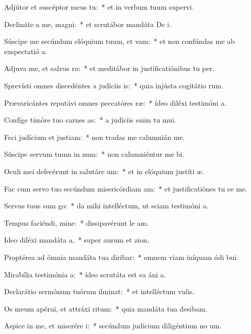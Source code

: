 \item Adjútor et suscéptor meus  tu:~* et in verbum tuum supervi.
\item Declináte a me, magni:~* et scrutábor mandáta De i.
\item Súscipe me secúndum elóquium tuum, et vam:~* et non confúndas me ab exspectatió a.
\item Adjuva me, et salvus ro:~* et meditábor in justificatiónibus tu per.
\item Sprevísti omnes discedéntes a judíciis is:~* quia injústa cogitátio rum.
\item Prævaricántes reputávi omnes peccatóres ræ:~* ídeo diléxi testimóni a.
\item Confíge timóre tuo carnes as:~* a judíciis enim tu mui.
\item Feci judícium et justiam:~* non tradas me calumnián me.
\item Súscipe servum tuum in num:~* non calumniéntur me bi.
\item Oculi mei defecérunt in salutáre um:~* et in elóquium justíti æ.
\item Fac cum servo tuo secúndum misericórdiam am:~* et justificatiónes tu ce me.
\item Servus tuus sum go:~* da mihi intelléctum, ut sciam testimóni a.
\item Tempus faciéndi, mine:~* dissipavérunt le am.
\item Ideo diléxi mandáta a,~* super aurum et zion.
\item Proptérea ad ómnia mandáta tua diribar:~* omnem viam iníquam ódi bui.
\item Mirabília testimónia a:~* ídeo scrutáta est ea áni a.
\item Declarátio sermónum tuórum ilminat:~* et intelléctum  vulis.
\item Os meum apérui, et attráxi ritum:~* quia mandáta tua desibam.
\item Aspice in me, et miserére i:~* secúndum judícium diligéntium no um.
